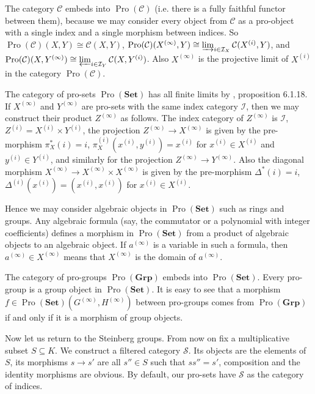 \documentclass{article}
\newcommand{\rar}{\rightarrow}
\newcommand{\Set}{\mathbf{Set}}
\newcommand{\Group}{\mathbf{Grp}}
\DeclareMathOperator{\Pro}{Pro}
\begin{document}
The category \(\mathcal C\) embeds into \(\Pro(\mathcal C)\) (i.e. there is a fully faithful functor between them), because we may consider every object from \(\mathcal C\) as a pro-object with a single index and a single morphism between indices. So \(\Pro(\mathcal C)(X, Y) \cong \mathcal C(X, Y)\), \(\Pro(\mathcal C)(X^{(\infty)}, Y) \cong \varinjlim_{i \in \mathcal I_X} \mathcal C(X^{(i)}, Y)\), and \(\Pro(\mathcal C)(X, Y^{(\infty)}) \cong \varprojlim_{i \in \mathcal I_Y} \mathcal C(X, Y^{(i)})\). Also \(X^{(\infty)}\) is the projective limit of \(X^{(i)}\) in the category \(\Pro(\mathcal C)\).

The category of pro-sets \(\Pro(\Set)\) has all finite limits by \cite{}, proposition 6.1.18. If \(X^{(\infty)}\) and \(Y^{(\infty)}\) are pro-sets with the same index category \(\mathcal I\), then we may construct their product \(Z^{(\infty)}\) as follows. The index category of \(Z^{(\infty)}\) is \(\mathcal I\), \(Z^{(i)} = X^{(i)} \times Y^{(i)}\), the projection \(Z^{(\infty)} \rar X^{(\infty)}\) is given by the pre-morphism \(\pi_X^*(i) = i\), \(\pi_X^{(i)}(x^{(i)}, y^{(i)}) = x^{(i)}\) for \(x^{(i)} \in X^{(i)}\) and \(y^{(i)} \in Y^{(i)}\), and similarly for the projection \(Z^{(\infty)} \rar Y^{(\infty)}\). Also the diagonal morphism \(X^{(\infty)} \rar X^{(\infty)} \times X^{(\infty)}\) is given by the pre-morphism \(\Delta^*(i) = i\), \(\Delta^{(i)}(x^{(i)}) = (x^{(i)}, x^{(i)})\) for \(x^{(i)} \in X^{(i)}\).

Hence we may consider algebraic objects in \(\Pro(\Set)\) such as rings and groups. Any algebraic formula (say, the commutator or a polynomial with integer coefficients) defines a morphism in \(\Pro(\Set)\) from a product of algebraic objects to an algebraic object. If \(a^{(\infty)}\) is a variable in such a formula, then \(a^{(\infty)} \in X^{(\infty)}\) means that \(X^{(\infty)}\) is the domain of \(a^{(\infty)}\).

The category of pro-groups \(\Pro(\Group)\) embeds into \(\Pro(\Set)\). Every pro-group is a group object in \(\Pro(\Set)\). It is easy to see that a morphism \(f \in \Pro(\Set)(G^{(\infty)}, H^{(\infty)})\) between pro-groups comes from \(\Pro(\Group)\) if and only if it is a morphism of group objects.

Now let us return to the Steinberg groups. From now on fix a multiplicative subset \(S \subseteq K\). We construct a filtered category \(\mathcal S\). Its objects are the elements of \(S\), its morphisms \(s \rar s'\) are all \(s'' \in S\) such that \(ss'' = s'\), composition and the identity morphisms are obvious. By default, our pro-sets have \(\mathcal S\) as the category of indices.
\end{document}
